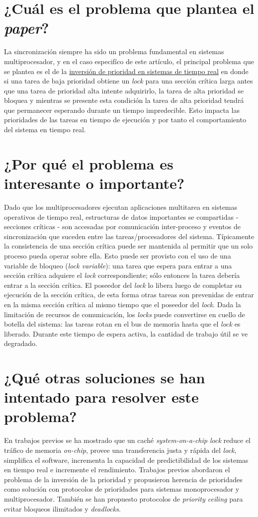 \section{¿Cuál es el problema que plantea el \textit{paper}?}
La sincronización siempre ha sido un problema fundamental en sistemas multiprocesador, y en el caso especifíco de este artículo, el principal problema que se plantea es el de la \underline{inversión de prioridad en sistemas de tiempo real} en donde si una tarea de baja prioridad obtiene un \textit{lock} para una sección crítica larga antes que una tarea de prioridad alta intente adquirirlo, la tarea de alta prioridad se bloquea y mientras se presente esta condición la tarea de alta prioridad tendrá que permanecer esperando durante un tiempo impredecible. Esto impacta las prioridades de las tareas en tiempo de ejecución y por tanto el comportamiento del sistema en tiempo real.

\section{¿Por qué el problema es interesante o importante?}
Dado que los multiprocesadores ejecutan aplicaciones multitarea en sistemas operativos de tiempo real, estructuras de datos importantes se compartidas - secciones críticas - son accesadas por comunicación inter-proceso y eventos de sincronización que suceden entre las tareas/procesadores del sistema. Típicamente la consistencia de una sección crítica puede ser mantenida al permitir que un solo proceso pueda operar sobre ella. Esto puede ser provisto con el uso de una variable de bloqueo (\textit{lock variable}): una tarea que espera para entrar a una sección crítica adquiere el \textit{lock} correspondiente; sólo entonces la tarea debería entrar a la sección crítica. El poseedor del \textit{lock} lo libera luego de completar su ejecución de la sección crítica, de esta forma otras tareas son prevenidas de entrar en la misma sección crítica al mismo tiempo que el poseedor del \textit{lock}. Dada la limitación de recursos de comunicación, los \textit{locks} puede convertirse en cuello de botella del sistema: las tareas rotan en  el bus de memoria hasta que el \textit{lock} es liberado. Durante este tiempo de espera activa, la cantidad de trabajo útil se ve degradado. 


\section{¿Qué otras soluciones se han intentado para resolver este problema?}
En trabajos previos se ha mostrado que un caché \textit{system-on-a-chip lock} reduce el tráfico de memoria \textit{on-chip}, provee una transferencia justa y rápida del \textit{lock}, simplifica el software, incrementa la capacidad de predictibilidad de los sistemas en tiempo real e incremente el rendimiento. Trabajos previos abordaron el problema de la inversión de la prioridad y propusieron herencia de prioridades como solución con protocolos de prioridades para sistemas monoprocesador y multiprocesador. También se han propuesto protocolos de \textit{priority ceiling} para evitar bloqueos ilimitados y \textit{deadlocks}.
     
